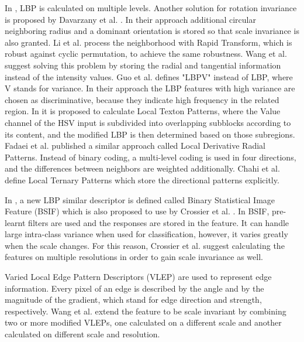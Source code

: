 \documentclass[draft,final]{vutinfth} %
\begin{document}
In \cite{khellah2011texture}, LBP is calculated on multiple levels.
Another solution for rotation invariance is proposed by Davarzany et al. \cite{davarzani2015scale}. 
In their approach additional circular neighboring radius and a dominant orientation is stored so that scale invariance is also granted.
Li et al. \cite{li2014rapid} process the neighborhood with Rapid Transform, which is robust against cyclic permutation, to achieve the same robustness.
Wang et al. \cite{wang2017local} suggest solving this problem by storing the radial and tangential information instead of the intensity values.
Guo et al. \cite{guo2010rotation} defines "LBPV" instead of LBP, where V stands for variance. 
In their approach the LBP features with high variance are chosen as discriminative, because they indicate high frequency in the related region.
In \cite{bala2016local} it is proposed to calculate Local Texton Patterns, where the Value channel of the HSV input is subdivided into overlapping subblocks according to its content, and the modified LBP is then determined based on those subregions.
Fadaei et al. \cite{fadaei2017local} published a similar approach called Local Derivative Radial Patterns.
Instead of binary coding, a multi-level coding is used in four directions, and the differences between neighbors are weighted additionally.
Chahi et al. \cite{chahi2018local} define Local Ternary Patterns which store the directional patterns explicitly.
\par
In \cite{kannala2012bsif}, a new LBP similar descriptor is defined called Binary Statistical Image Feature (BSIF) which is also proposed to use by Crossier et al. \cite{crosier2010using}. %
In BSIF, pre-learnt filters are used and the responses are stored in the feature.
It can handle large intra-class variance when used for classification, however, it varies greatly when the scale changes. 
For this reason, Crossier et al. \cite{crosier2010using} suggest calculating the features on multiple resolutions in order to gain scale invariance as well.
\par
Varied Local Edge Pattern Descriptors (VLEP) \cite{yan2016edge} are used to represent edge information.
Every pixel of an edge is described by the angle and by the magnitude of the gradient, which stand for edge direction and strength, respectively. 
Wang et al. \cite{wang2018using} extend the feature to be scale invariant by combining two or more modified VLEPs, one calculated on a different scale and another calculated on different scale and resolution.
\end{document}
